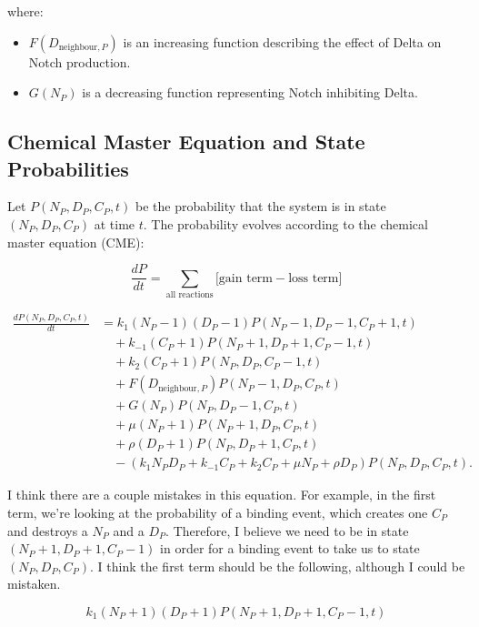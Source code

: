 \documentclass{article}
\begin{document}
where:
\begin{itemize}
    \item \( F(D_{\text{neighbour},P}) \) is an increasing function describing the effect of Delta on Notch production.
    \item \( G(N_P) \) is a decreasing function representing Notch inhibiting Delta.
\end{itemize}

\subsection{Chemical Master Equation and State Probabilities}
Let \( P(N_P, D_P, C_P, t) \) be the probability that the system is in state \( (N_P, D_P, C_P) \) at time \( t \). The probability evolves according to the chemical master equation (CME):

\[
\frac{dP}{dt} = \sum_{\text{all reactions}} \Big[ \text{gain term} - \text{loss term} \Big]
\]

\begin{align*}
  \frac{dP(N_P, D_P, C_P, t)}{dt} &= k_1 (N_P - 1)(D_P - 1) P(N_P - 1, D_P - 1, C_P + 1, t) \\
  &\quad + k_{-1} (C_P + 1) P(N_P + 1, D_P + 1, C_P - 1, t) \\
  &\quad + k_2 (C_P + 1) P(N_P, D_P, C_P - 1, t) \\
  &\quad + F(D_{\text{neighbour},P}) P(N_P - 1, D_P, C_P, t) \\
  &\quad + G(N_P) P(N_P, D_P - 1, C_P, t) \\
  &\quad + \mu (N_P + 1) P(N_P + 1, D_P, C_P, t) \\
  &\quad + \rho (D_P + 1) P(N_P, D_P + 1, C_P, t) \\
  &\quad - (k_1 N_P D_P + k_{-1} C_P + k_2 C_P + \mu N_P + \rho D_P) P(N_P, D_P, C_P, t).
\end{align*}

\color{red}

I think there are a couple mistakes in this equation. For example, in the first term, we're looking at the probability of a binding event, which creates one $C_{P}$ and destroys a $N_{P}$ and a $D_{P}$. Therefore, I believe we need to be in state $(N_{P} + 1, D_{P} + 1, C_{P} - 1)$  in order for a binding event to take us to state $(N_{P}, D_{P}, C_{P})$. I think the first term should be the following, although I could be mistaken.

$$
k_{1} (N_{P} + 1)(D_{P} + 1) P(N_{P} + 1, D_{P} + 1, C_{P} - 1, t)
$$
\end{document}
